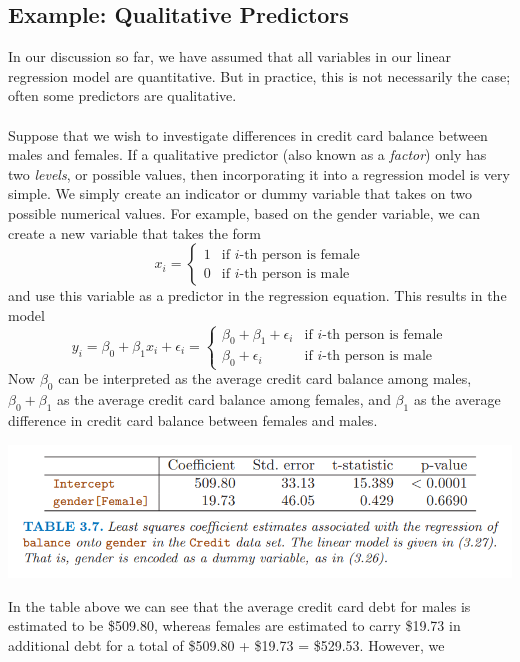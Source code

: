 \subsection{Example: Qualitative Predictors}
In our discussion so far, we have assumed that all variables in our linear
regression model are quantitative. But in practice, this is not necessarily
the case; often some predictors are qualitative.\\\\
Suppose that we wish to investigate differences in credit card balance between males and females. If a qualitative predictor (also known as a \textit{factor}) only has two \textit{levels}, or possible values, then incorporating it into a regression model is very simple. We simply create an indicator or dummy variable that takes on two possible numerical values. For example, based on the gender variable, we can create a new variable that takes the form
\[
x_i = 
\begin{cases}
    1 & \text{if $i$-th person is female}\\
    0 & \text{if $i$-th person is male}
\end{cases}
\]
and use this variable as a predictor in the regression equation. This results
in the model
\[y_i = \beta_0 + \beta_1 x_i + \epsilon_i = 
\begin{cases}
    \beta_0 + \beta_1 + \epsilon_i & \text{if $i$-th person is female}\\
    \beta_0 + \epsilon_i & \text{if $i$-th person is male}
\end{cases}
\]
Now $\beta_0$ can be interpreted as the average credit card balance among males, $\beta_0 + \beta_1$ as the average credit card balance among females, and $\beta_1$ as the average difference in credit card balance between females and males.
\begin{center}
    \includegraphics[scale=0.8]{images/dummy_var_1.png}
\end{center}
In the table above we can see that the average credit card debt for males is
estimated to be \$509.80, whereas females are estimated to carry \$19.73 in
additional debt for a total of \$509.80 + \$19.73 = \$529.53. However, we
